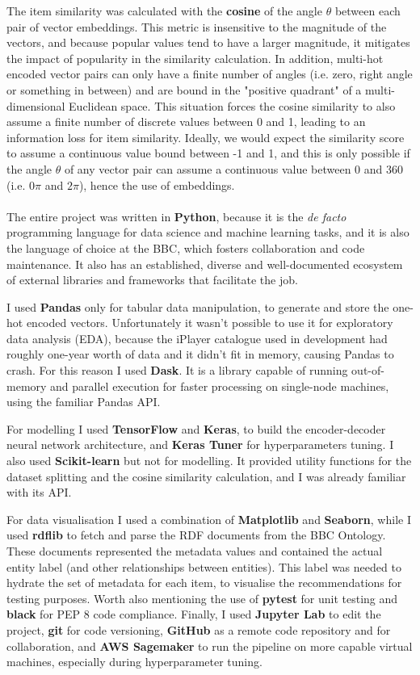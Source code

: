 The item similarity was calculated with the \textbf{cosine} of the angle $\theta$ between each pair of vector embeddings. This metric
is insensitive to the magnitude of the vectors, and because popular values tend to have a larger magnitude, it mitigates the impact of
popularity in the similarity calculation. In addition, multi-hot encoded vector pairs can only have a finite number of angles
(i.e. zero, right angle or something in between) and are bound in the "positive quadrant" of a multi-dimensional Euclidean space.
This situation forces the cosine similarity to also assume a finite number of discrete values between 0 and 1, leading to an information
loss for item similarity. Ideally, we would expect the similarity score to assume a continuous value bound between -1 and 1, and this
is only possible if the angle $\theta$ of any vector pair can assume a continuous value between 0 and 360 (i.e. $0\pi$ and $2\pi$), hence
the use of embeddings.
\\ \\
The entire project was written in \textbf{Python}, because it is the \textit{de facto} programming language for data science
and machine learning tasks, and it is also the language of choice at the BBC, which fosters collaboration and code maintenance.
It also has an established, diverse and well-documented ecosystem of external libraries and frameworks that facilitate the job.

I used \textbf{Pandas} only for tabular data manipulation, to generate and store the one-hot encoded vectors. Unfortunately it wasn't possible
to use it for exploratory data analysis (EDA), because the iPlayer catalogue used in development had roughly one-year worth of data and it didn't
fit in memory, causing Pandas to crash. For this reason I used \textbf{Dask}. It is a library capable of running out-of-memory and
parallel execution for faster processing on single-node machines, using the familiar Pandas API.

For modelling I used \textbf{TensorFlow} and \textbf{Keras}, to build the encoder-decoder neural network architecture, and \textbf{Keras Tuner} for
hyperparameters tuning. I also used \textbf{Scikit-learn} but not for modelling. It provided utility functions for the dataset splitting and
the cosine similarity calculation, and I was already familiar with its API.

For data visualisation I used a combination of \textbf{Matplotlib} and \textbf{Seaborn}, while I used \textbf{rdflib} to fetch and parse
the RDF documents from the BBC Ontology. These documents represented the metadata values and contained the actual entity label (and other
relationships between entities).
This label was needed to hydrate the set of metadata for each item, to visualise the recommendations for testing purposes.
Worth also mentioning the use of \textbf{pytest} for unit testing and \textbf{black} for PEP 8 code compliance.
Finally, I used \textbf{Jupyter Lab} to edit the project, \textbf{git} for code versioning, \textbf{GitHub} as a remote code repository
and for collaboration, and \textbf{AWS Sagemaker} to run the pipeline on more capable virtual machines, especially during hyperparameter tuning.
